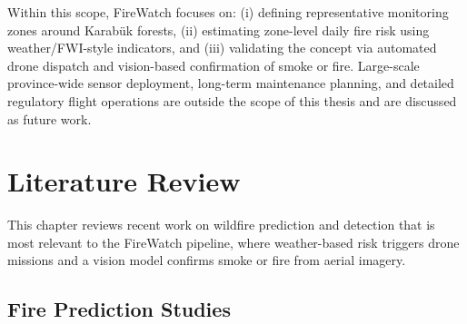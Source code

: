 \documentclass[11pt,a4paper]{report}
\begin{document}
Within this scope, FireWatch focuses on: (i) defining representative monitoring zones around
Karabük forests, (ii) estimating zone-level daily fire risk using weather/FWI-style indicators, and
(iii) validating the concept via automated drone dispatch and vision-based confirmation of smoke or
fire. Large-scale province-wide sensor deployment, long-term maintenance planning, and detailed
regulatory flight operations are outside the scope of this thesis and are discussed as future work.

\chapter{Literature Review}

This chapter reviews recent work on wildfire prediction and detection that is most relevant to the FireWatch pipeline, where weather-based risk triggers drone missions and a vision model confirms smoke or fire from aerial imagery.

\section{Fire Prediction Studies}
\end{document}
